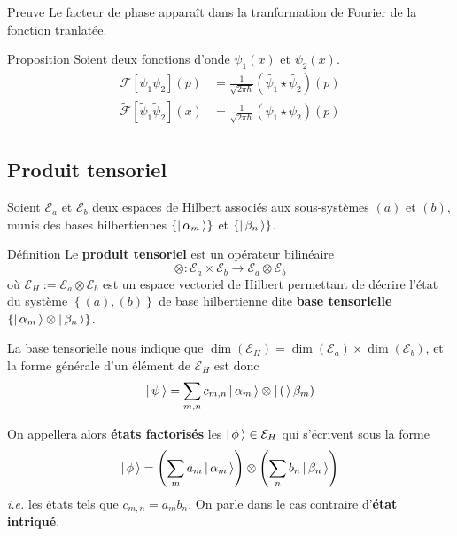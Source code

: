         \begin{demo}{Preuve}
            Le facteur de phase apparaît dans la tranformation de Fourier de la fonction tranlatée.
        \end{demo}

        \begin{omed}{Proposition}
            Soient deux fonctions d’onde $\psi_1(x)$ et $\psi_2(x)$.
            \begin{align*}
                \mathcal{F}[\psi_1 \psi_2](p) &= \frac{1}{\sqrt{2 \pi \hbar}} (\tilde{\psi_1} \star \tilde{\psi_2}) (p)  \\
                \tilde{\mathcal{F}}[\tilde{\psi}_1 \tilde{\psi}_2](x) &= \frac{1}{\sqrt{2 \pi \hbar}} (\psi_1 \star \psi_2) (p)  \\
            \end{align*}
        \end{omed}


    \subsection{Produit tensoriel}

    Soient $\mathcal{E}_a$ et $\mathcal{E}_b$ deux espaces de Hilbert associés aux sous-systèmes $(a)$ et $(b)$, munis des bases hilbertiennes $\left\{\left| \, \alpha_m \, \right>\right\}$ et $\left\{ \left| \, \beta_n \, \right> \right\}$. 

    \begin{omed}{Définition}
        Le \textbf{produit tensoriel} est un opérateur bilinéaire 
        \[ \otimes : \mathcal{E}_a \times \mathcal{E}_b \to \mathcal{E}_a \otimes \mathcal{E}_b \] 
        où $\mathcal{E}_H := \mathcal{E}_a \otimes \mathcal{E}_b$ est un espace vectoriel de Hilbert permettant de décrire l’état du système $\left\{ (a),(b) \right\}$ de base hilbertienne dite \textbf{base tensorielle} $\left\{ \left| \, \alpha_m \, \right> \otimes \left| \, \beta_n \, \right> \right\}$.
    \end{omed}

    La base tensorielle nous indique que $\dim(\mathcal{E}_H) = \dim(\mathcal{E}_a) \times \dim(\mathcal{E}_b)$, et la forme générale d’un élément de $\mathcal{E}_H$ est donc 
    \[ \left| \, \psi \, \right> = \sum_{m,n} c_{m,n} \left| \, \alpha_m \, \right> \otimes \left| \, ( \, \right>\beta_m) \] 

    On appellera alors \textbf{états factorisés} les $\left| \, \phi \, \right> \in \mathcal{E}_H$ qui s’écrivent sous la forme 
    \[ \left| \, \phi \, \right> = \left( \sum_{m} a_m \left| \, \alpha_m \, \right> \right) \otimes \left( \sum_{n} b_n \left| \, \beta_n \, \right> \right) \]
    \textit{i.e.} les états tels que $c_{m,n} = a_m b_n$. On parle dans le cas contraire d’\textbf{état intriqué}. 


